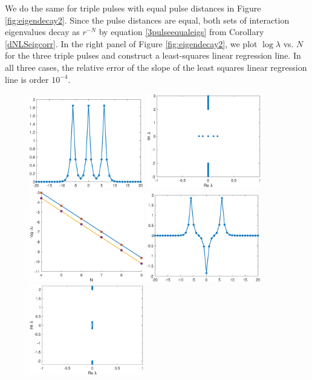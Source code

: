\documentclass[12pt]{article}
\begin{document}
We do the same for triple pulses with equal pulse distances in Figure \ref{fig:eigendecay2}. Since the pulse distances are equal, both sets of interaction eigenvalues decay as $r^{-N}$ by equation \eqref{3pulseequaleigs} from Corollary \ref{dNLSeigcorr}. In the right panel of Figure \ref{fig:eigendecay2}, we plot $\log \lambda$ vs. $N$ for the three triple pulses and construct a least-squares linear regression line. In all three cases, the relative error of the slope of the least squares linear regression line is order $10^{-4}$. 

\begin{figure}[H]
\centering
\includegraphics[width=5cm]{dnlsPPP.eps}
\includegraphics[width=5cm]{dnlsPPPeig.eps}
\includegraphics[width=5cm]{dnlsPPPdecay.eps}
\includegraphics[width=5cm]{dnlsPMP.eps}
\includegraphics[width=5cm]{dnlsPMPeig.eps}

\end{figure}
\end{document}
